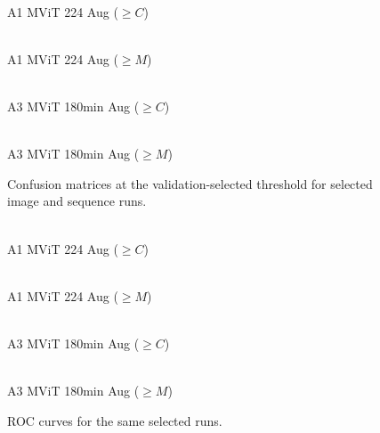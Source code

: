 \begin{figure}[!htbp]
\centering
\begin{minipage}{0.48\textwidth}
\centering
{}
\\[-1mm]\scriptsize A1 MViT 224 Aug ($\geq C$)
\end{minipage}\hfill
\begin{minipage}{0.48\textwidth}
\centering
{}
\\[-1mm]\scriptsize A1 MViT 224 Aug ($\geq M$)
\end{minipage}
\vspace{2mm}
\begin{minipage}{0.48\textwidth}
\centering
{}
\\[-1mm]\scriptsize A3 MViT 180min Aug ($\geq C$)
\end{minipage}\hfill
\begin{minipage}{0.48\textwidth}
\centering
{}
\\[-1mm]\scriptsize A3 MViT 180min Aug ($\geq M$)
\end{minipage}
\caption{Confusion matrices at the validation-selected threshold for selected image and sequence runs.}
\label{fig:appendix_cm_grid}
\end{figure}

\begin{figure}[!htbp]
\centering
\begin{minipage}{0.48\textwidth}
\centering
{}
\\[-1mm]\scriptsize A1 MViT 224 Aug ($\geq C$)
\end{minipage}\hfill
\begin{minipage}{0.48\textwidth}
\centering
{}
\\[-1mm]\scriptsize A1 MViT 224 Aug ($\geq M$)
\end{minipage}
\vspace{2mm}
\begin{minipage}{0.48\textwidth}
\centering
{}
\\[-1mm]\scriptsize A3 MViT 180min Aug ($\geq C$)
\end{minipage}\hfill
\begin{minipage}{0.48\textwidth}
\centering
{}
\\[-1mm]\scriptsize A3 MViT 180min Aug ($\geq M$)
\end{minipage}
\caption{ROC curves for the same selected runs.}
\label{fig:appendix_roc_grid}
\end{figure}


